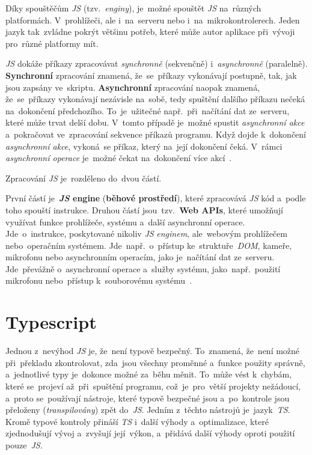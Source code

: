 \documentclass[11pt,a4paper]{report}
\let\oldacrshort\acrshort
\renewcommand{\acrshort}[1]{\emph{\normalsize\color[rgb]{0,0,0}\noindent\oldacrshort{#1}}}
\begin{document}
            Díky spouštěčům \acrshort{JS} (tzv.~\emph{enginy}), je~možné spouštět \acrshort{JS} na~různých platformách. V~prohlížeči, ale i~na~serveru nebo i~na~mikrokontrolerech. Jeden jazyk tak~zvládne pokrýt většinu potřeb, které může autor aplikace při~vývoji pro~různé platformy mít.

            \acrshort{JS} dokáže příkazy zpracovávat \emph{synchronně} (sekvenčně) i~\emph{asynchronně} (paralelně). \textbf{Synchronní} zpracování znamená, že~se~příkazy vykonávají postupně, tak, jak jsou zapsány ve~skriptu. \textbf{Asynchronní} zpracování naopak znamená, že~se~příkazy vykonávají nezávisle na~sobě, tedy spuštění dalšího příkazu nečeká na~dokončení předchozího. To~je~užitečné např.~při~načítání dat ze~serveru, které může trvat delší dobu. V~tomto případě je~možné spustit \emph{asynchronní akce} a~pokračovat ve~zpracování sekvence příkazů programu. Když dojde k~dokončení \emph{asynchronní akce}, vykoná~se příkaz, který na~její dokončení čeká. V~rámci \emph{asynchronní operace} je~možné čekat na~dokončení více akcí~\cite{ajax:mdn, Scott2019:programmingpragmatics}.

            Zpracování \acrshort{JS} je~rozděleno do~dvou částí.
            
            První částí je~\textbf{\acrshort{JS} engine} (\textbf{běhové prostředí}), které zpracovává \acrshort{JS} kód a~podle toho spouští instrukce. Druhou částí jsou~tzv.~\textbf{Web APIs}, které umožňují využívat funkce prohlížeče, systému a~další {asynchronní} operace. Jde~o~instrukce, poskytované nikoliv \acrshort{JS} \emph{enginem}, ale~webovým prohlížečem nebo~operačním systémem. Jde~např.~o~přístup ke~struktuře~\acrshort{DOM}, kameře, mikrofonu nebo asynchronním operacím, jako je~načítání dat ze~serveru. Jde~převážně o~asynchronní operace a~služby systému, jako~např.~použití mikrofonu nebo~přístup k~souborovému systému~\cite{kantor_javascript}.

        \section{Typescript}
            Jednou z~nevýhod \acrshort{JS} je, že~není typově bezpečný. To~znamená, že~není možné při~překladu zkontrolovat, zda~jsou všechny proměnné a~funkce použity správně, a~jednotlivé typy je~dokonce možné za~běhu měnit. To~může vést k~chybám, které se~projeví až~při~spuštění programu, což~je~pro~větší projekty nežádoucí, a~proto se~používají nástroje, které typově bezpečné jsou a~po~kontrole jsou přeloženy (\emph{transpilovány}) zpět do~\acrshort{JS}. Jedním z~těchto nástrojů je~jazyk~\acrshort{TS}. Kromě typové kontroly přináší \acrshort{TS} i~další výhody a~optimalizace, které zjednodušují vývoj a~zvyšují její~výkon, a~přidává další výhody oproti použití pouze~\acrshort{JS}.
\end{document}
